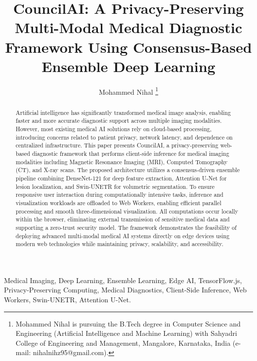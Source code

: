\documentclass[journal]{IEEEtran}
\begin{document}
\title{
CouncilAI: A Privacy-Preserving Multi-Modal Medical Diagnostic Framework Using Consensus-Based Ensemble Deep Learning
}

\author{
Mohammed Nihal
\thanks{
Mohammed Nihal is pursuing the B.Tech degree in Computer Science and Engineering (Artificial Intelligence and Machine Learning) with Sahyadri College of Engineering and Management, Mangalore, Karnataka, India (e-mail: nihalnihz95@gmail.com).
}
}

\maketitle

\begin{abstract}
Artificial intelligence has significantly transformed medical image analysis, enabling faster and more accurate diagnostic support across multiple imaging modalities. However, most existing medical AI solutions rely on cloud-based processing, introducing concerns related to patient privacy, network latency, and dependence on centralized infrastructure. This paper presents CouncilAI, a privacy-preserving web-based diagnostic framework that performs client-side inference for medical imaging modalities including Magnetic Resonance Imaging (MRI), Computed Tomography (CT), and X-ray scans. The proposed architecture utilizes a consensus-driven ensemble pipeline combining DenseNet-121 for deep feature extraction, Attention U-Net for lesion localization, and Swin-UNETR for volumetric segmentation. To ensure responsive user interaction during computationally intensive tasks, inference and visualization workloads are offloaded to Web Workers, enabling efficient parallel processing and smooth three-dimensional visualization. All computations occur locally within the browser, eliminating external transmission of sensitive medical data and supporting a zero-trust security model. The framework demonstrates the feasibility of deploying advanced multi-modal medical AI systems directly on edge devices using modern web technologies while maintaining privacy, scalability, and accessibility.
\end{abstract}

\begin{IEEEkeywords}
Medical Imaging, Deep Learning, Ensemble Learning,
Edge AI, TensorFlow.js, Privacy-Preserving Computing,
Medical Diagnostics, Client-Side Inference,
Web Workers, Swin-UNETR, Attention U-Net.
\end{IEEEkeywords}
\end{document}
